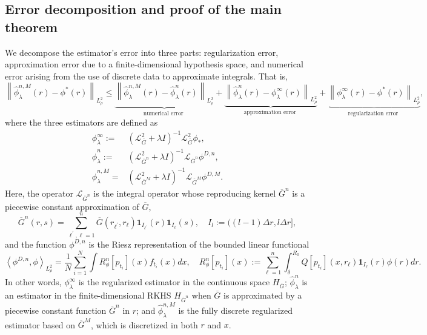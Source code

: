 \documentclass[12pt]{article}
\def\Gbar{ {\overline{G}} }
\numberwithin{equation}{section}
\numberwithin{theorem}{section}
\begin{document}
\subsection{Error decomposition and proof of the main theorem}\label{sec:error_decomposition}
We decompose the estimator's error into three parts: regularization error, approximation error due to a finite-dimensional hypothesis space, and numerical error arising from the use of discrete data to approximate integrals. That is, 
$$
\left\|\hat{\phi}_\lambda^{n, M}(r)-\phi^*(r)\right\|_{L_\rho^2} \leq \underbrace{\left\|\hat{\phi}_\lambda^{n, M}(r)-\hat{\phi}_\lambda^n(r)\right\|_{L_\rho^2}}_{\text {numerical error }}+\underbrace{\left\|\hat{\phi}_\lambda^n(r)-{\phi}_\lambda^{\infty}(r)\right\|_{L_\rho^2}}_{\text {approximation error }}+\underbrace{\left\|{\phi}_\lambda^{\infty}(r)-\phi^*(r)\right\|_{L_\rho^2}}_{\text {regularization error }}, 
$$
where the three estimators are defined as 
\begin{equation}
\label{eq:defphi}
\begin{aligned}
    {\phi}_\lambda^{\infty} :=&\left(\mathcal{L}_{\Gbar}^2+\lambda I\right)^{-1} \mathcal{L}_{\Gbar}^2\phi_*, \\
 	   \hat{\phi}_\lambda^n :=&\left(\mathcal{L}_{\Gbar^n}^2+\lambda I\right)^{-1} \mathcal{L}_{\Gbar^n} \phi^{D,n}, \\
 	   \hat{\phi}_\lambda^{n,M} =& (\mathcal{L}_{\Gbar^M}^2 + \lambda I)^{-1}\mathcal{L}_{\Gbar^M}\phi^{D,M}. 
\end{aligned}
 \end{equation}
Here, the operator $\mathcal{L}_{\Gbar^n}$ is the integral operator whose reproducing kernel $ \Gbar^n$ is a piecewise constant approximation of $\Gbar$,  
  \begin{equation}\label{eq:Gbar^n}
    \Gbar^n(r, s)=\sum_{\ell^{'}, \ell=1}^n \Gbar \left(r_{\ell^{'}}, r_{\ell}\right) \mathbf{1}_{I_{\ell^{'}}}(r) \mathbf{1}_{I_{\ell}}(s), \quad I_l:=((l-1) \Delta r, l \Delta r],  
   \end{equation}
 and the function $\phi^{D, n}$ is the Riesz representation of the bounded linear functional  
\begin{equation}
\label{eq:Rieszn}
\left\langle\phi^{D, n}, \phi\right\rangle_{L^2_{\rho}} = \frac{1}{N} \sum_{i=1}^N \int R^n_{\phi}\left[p_{t_i}\right](x) f_{t_i}(x) d x, \quad 
R_\phi^n\left[p_{t_i}\right](x):=\sum_{\ell=1}^n \int_\delta^{R_0} Q\left[p_{t_i}\right](x, r_{\ell})\mathbf{1}_{I_{\ell}}(r) \phi(r) d r. 
\end{equation}
In other words, ${\phi}_\lambda^{\infty}$ is the regularized estimator in the continuous space $H_{\Gbar}$; $\hat{\phi}_\lambda^n$ is an estimator in the finite-dimensional RKHS $H_{\Gbar^n}$ when $\Gbar$ is approximated by a piecewise constant function $\Gbar^n$ in $r$; and $\hat\phi_\lambda^{n,M}$ is the fully discrete regularized estimator based on $\Gbar^M$, which is discretized in both $r$ and $x$.
\end{document}
